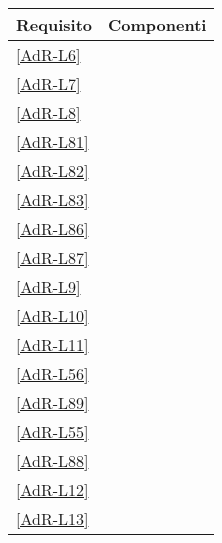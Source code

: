 \begin{longtable}{|>{\centering}m{2cm}|m{12cm}|}
	\hline \textbf{Requisito} & \textbf{Componenti} \tabularnewline 
	\endfirsthead
	\hline \ref{AdR-L6} & \coderef{Framework::Controller::GenericBubble} \tabularnewline %
	\hline \ref{AdR-L7} & \coderef{Framework::Controller::GenericBubble} \tabularnewline 
	\hline \ref{AdR-L8} & \coderef{Framework::Model::API::DBOperations::DBOperations} \tabularnewline
	\hline \ref{AdR-L81} & \coderef{Framework::Model::API::DBOperations::DBOperations} \tabularnewline
	\hline \ref{AdR-L82} & \coderef{Framework::Model::API::DBOperations::DBOperations} \tabularnewline
	\hline \ref{AdR-L83} & \coderef{Framework::Model::API::DBOperations::DBOperations} \tabularnewline %
	\hline \ref{AdR-L86} & \coderef{Framework::Controller::GenericBubble} \tabularnewline
	\hline \ref{AdR-L87} & \coderef{Framework::Controller::GenericBubble} \tabularnewline
	\hline \ref{AdR-L9} & \coderef{Framework::Model::API::LifeCycle::LifeCycle} \tabularnewline
	\hline \ref{AdR-L10} & \coderef{Framework::Model::API::LifeCycle::LifeCycle} \tabularnewline
	\hline \ref{AdR-L11} & \coderef{Framework::Controller::GenericBubble} \linebreak \coderef{Framework::View::GUIContainer} \linebreak \coderef{Framework::View::GUI::GUI} \tabularnewline %
	\hline \ref{AdR-L56} & \coderef{Framework::Controller::GenericBubble} \linebreak \coderef{Framework::View::GUIContainer} \linebreak \coderef{Framework::View::GUI::GUI} \tabularnewline
	\hline \ref{AdR-L89} & \coderef{Framework::Model::API::DBOperations::DBOperations} \linebreak \coderef{Framework::Controller::GenericBubble} \linebreak \coderef{Framework::View::GUIContainer} \tabularnewline
	\hline \ref{AdR-L55} & \coderef{Framework::Controller::GenericBubble} \linebreak \coderef{Framework::View::GUIContainer} \tabularnewline
	\hline \ref{AdR-L88} & \coderef{Framework::Controller::GenericBubble} \linebreak \coderef{Framework::View::GUIContainer} \tabularnewline
	\hline \ref{AdR-L12} & \coderef{Framework::View::GUI::Label} \linebreak \coderef{Framework::View::GUI::GUI} \tabularnewline %
	\hline \ref{AdR-L13} & \coderef{Framework::View::GUI::GUIContainer} \linebreak \coderef{Framework::View::GUI::GUI} \tabularnewline

\end{longtable}
